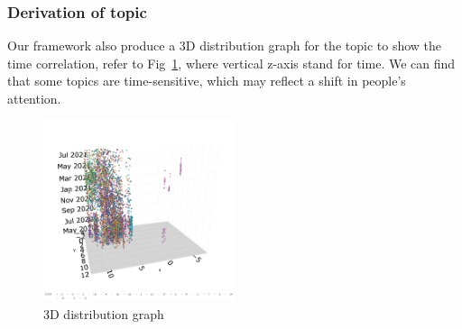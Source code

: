 \subsubsection{Derivation of topic}
Our framework also produce a 3D distribution graph for the topic to show the time correlation, refer to Fig~\ref{fig:3D distribution}, where vertical z-axis stand for time. We can find that some topics are time-sensitive, which may reflect a shift in people's attention.

\begin{figure}[h]
\centering
\includegraphics[width=0.5\textwidth]{imgs/lda_bert/3D_vis.png}
\caption{3D distribution graph}
\label{fig:3D distribution}
\end{figure}